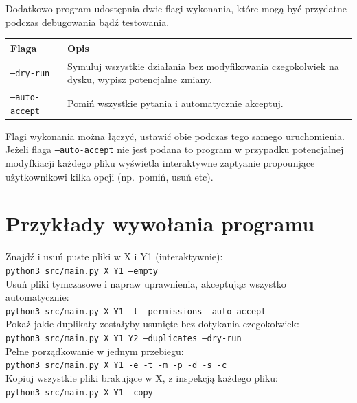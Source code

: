 \documentclass[12pt, a4paper]{article}
\begin{document}
Dodatkowo program udostępnia dwie flagi wykonania, które mogą być przydatne
podczas debugowania bądź testowania.
\begin{table}[H]
	\begin{tabularx}{\linewidth}{|l|X|}
		\hline
		\textbf{Flaga}          & \textbf{Opis}                                                                                   \\
		\hline
		\texttt{---dry-run}     & Symuluj wszystkie działania bez modyfikowania czegokolwiek na dysku, wypisz potencjalne zmiany. \\
		\hline
		\texttt{---auto-accept} & Pomiń wszystkie pytania i automatycznie akceptuj.                                               \\
		\hline
	\end{tabularx}
\end{table}
Flagi wykonania można łączyć, ustawić obie podczas tego samego uruchomienia.
Jeżeli flaga \texttt{---auto-accept} nie jest podana to program w przypadku
potencjalnej modyfkiacji każdego pliku wyświetla interaktywne zaptyanie
propounjące użytkownikowi kilka opcji (np.\ pomiń, usuń etc).

\newpage
\section*{Przykłady wywołania programu}

Znajdź i usuń puste pliki w X i Y1 (interaktywnie): \\
\texttt{python3 src/main.py X Y1 --empty} \\

Usuń pliki tymczasowe i napraw uprawnienia, akceptując wszystko automatycznie: \\
\texttt{python3 src/main.py X Y1 -t --permissions --auto-accept} \\

Pokaż jakie duplikaty zostałyby usunięte bez dotykania czegokolwiek: \\
\texttt{python3 src/main.py X Y1 Y2 --duplicates --dry-run} \\

Pełne porządkowanie w jednym przebiegu: \\
\texttt{python3 src/main.py X Y1 -e -t -m -p -d -s -c} \\

Kopiuj wszystkie pliki brakujące w X, z inspekcją każdego pliku: \\
\texttt{python3 src/main.py X Y1 --copy}
\end{document}
